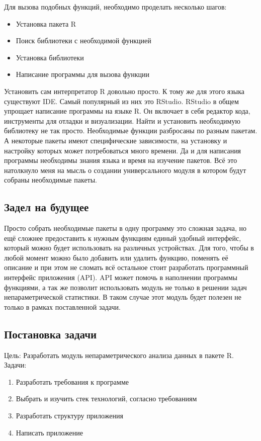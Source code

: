 \documentclass[14pt,a4paper]{scrartcl}
\begin{document}
    Для вызова подобных функций, необходимо проделать несколько шагов:

    \begin{itemize}[noitemsep]
        \item Установка пакета R
        \item Поиск библиотеки с необходимой функцией
        \item Установка библиотеки
        \item Написание программы для вызова функции
    \end{itemize}

    Установить сам интерпретатор R довольно просто. К тому же для этого языка существуют IDE. Самый популярный из них это RStudio. RStudio в общем упрощает написание программы на языке R. Он включает в себя редактор кода, инструменты для отладки и визуализации. Найти и установить необходимую библиотеку не так просто. Необходимые функции разбросаны по разным пакетам. А некоторые пакеты имеют специфические зависимости, на установку и настройку которых может потребоваться много времени. Да и для написания программы необходимы знания языка и время на изучение пакетов. Всё это натолкнуло меня на мысль о создании универсального модуля в котором будут собраны необходимые пакеты.

    \subsection[Задел на будущее]{Задел на будущее}
    Просто собрать необходимые пакеты в одну программу это сложная задача, но ещё сложнее предоставить к нужным функциям единый удобный интерфейс, который можно будет использовать на различных устройствах. Для того, чтобы в любой момент можно было добавить или удалить функцию, поменять её описание и при этом не сломать всё остальное стоит разработать программный интерфейс приложения (API). API может помочь в наполнении программы функциями, а так же позволит использовать модуль не только в решении задач непараметрической статистики. В таком случае этот модуль будет полезен не только в рамках поставленной задачи.

    \subsection{Постановка задачи}
    \noindent Цель: Разработать модуль непараметрического анализа данных в пакете R.
	\noindent Задачи:
    \begin{enumerate}
        \item Разработать требования к программе
        \item Выбрать и изучить стек технологий, согласно требованиям
        \item Разработать структуру приложения
        \item Написать приложение
    \end{enumerate}
\end{document}

